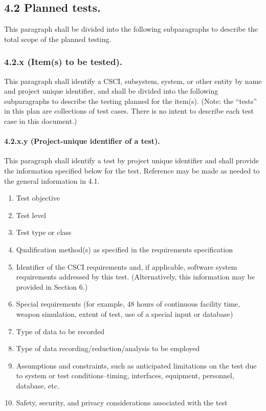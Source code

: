 \subsection{4.2 Planned tests.}

This paragraph shall be divided into the following subparagraphs to
describe the total scope of the planned testing.

\subsubsection{4.2.x (Item(s) to be tested).}

This paragraph shall identify a CSCI, subsystem, system, or other entity
by name and project unique identifier, and shall be divided into the
following subparagraphs to describe the testing planned for the item(s).
(Note: the ``tests'' in this plan are collections of test cases. There
is no intent to describe each test case in this document.)

\paragraph{4.2.x.y (Project-unique identifier of a test).}

This paragraph shall identify a test by project unique identifier and
shall provide the information specified below for the test. Reference
may be made as needed to the general information in 4.1.

\begin{enumerate}
\itemsep1pt\parskip0pt
\item
  Test objective
\item
  Test level
\item
  Test type or class
\item
  Qualification method(s) as specified in the requirements specification
\item
  Identifier of the CSCI requirements and, if applicable, software
  system requirements addressed by this test. (Alternatively, this
  information may be provided in Section 6.)
\item
  Special requirements (for example, 48 hours of continuous facility
  time, weapon simulation, extent of test, use of a special input or
  database)
\item
  Type of data to be recorded
\item
  Type of data recording/reduction/analysis to be employed
\item
  Assumptions and constraints, such as anticipated limitations on the
  test due to system or test conditions--timing, interfaces, equipment,
  personnel, database, etc.
\item
  Safety, security, and privacy considerations associated with the test
\end{enumerate}

